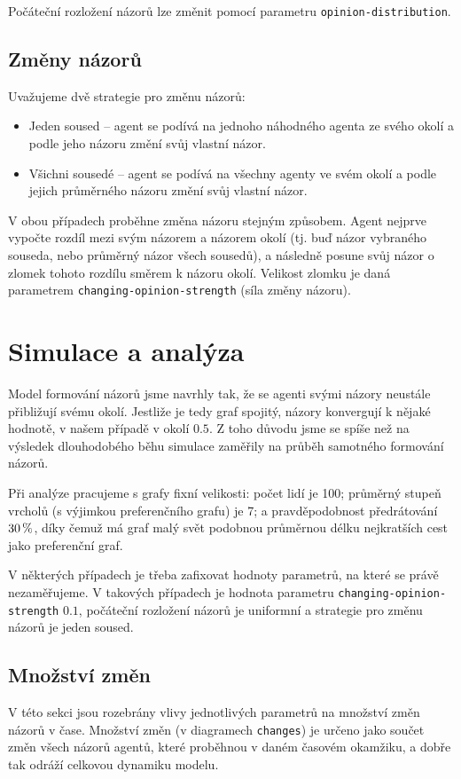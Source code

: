 \documentclass[10pt,a4paper]{report}
\begin{document}
Počáteční rozložení názorů lze změnit pomocí parametru \texttt{opinion-distri\-bution}. 

\section{Změny názorů}
Uvažujeme dvě strategie pro změnu názorů:

\begin{itemize}
	\item Jeden soused -- agent se podívá na jednoho náhodného agenta ze svého okolí a podle jeho názoru změní svůj vlastní názor.
	\item Všichni sousedé -- agent se podívá na všechny agenty ve svém okolí a podle jejich průměrného názoru změní svůj vlastní názor.
\end{itemize}

V obou případech proběhne změna názoru stejným způsobem. Agent nejprve vypočte rozdíl mezi svým názorem a názorem okolí (tj. buď názor vybraného souseda, nebo průměrný názor všech sousedů), a následně posune svůj názor o zlomek tohoto rozdílu směrem k názoru okolí. Velikost zlomku je daná parametrem \texttt{changing-opinion-strength} (síla změny názoru).








\chapter{Simulace a analýza}
Model formování názorů jsme navrhly tak, že se agenti svými názory neustále přibližují svému okolí. Jestliže je tedy graf spojitý, názory konvergují k nějaké hodnotě, v našem případě v okolí $0.5$. Z toho důvodu jsme se spíše než na výsledek dlouhodobého běhu simulace zaměřily na průběh samotného formování názorů.

Při analýze pracujeme s grafy fixní velikosti: počet lidí je 100; průměrný stupeň vrcholů (s výjimkou preferenčního grafu) je 7; a pravděpodobnost předrátování $30\thinspace\%$, díky čemuž má graf malý svět podobnou průměrnou délku nej\-kratších cest jako preferenční graf.

V některých případech je třeba zafixovat hodnoty parametrů, na které se právě nezaměřujeme. V takových případech je hodnota parametru \texttt{changing\--opinion\--strength} $0.1$, počáteční rozložení názorů je uniformní a strategie pro změnu názorů je jeden soused.

\section{Množství změn}
V této sekci jsou rozebrány vlivy jednotlivých parametrů na množství změn názorů v čase. Množství změn (v diagramech \texttt{changes}) je určeno jako součet změn všech názorů agentů, které proběhnou v daném časovém okamžiku, a dobře tak odráží celkovou dynamiku modelu.
\end{document}
